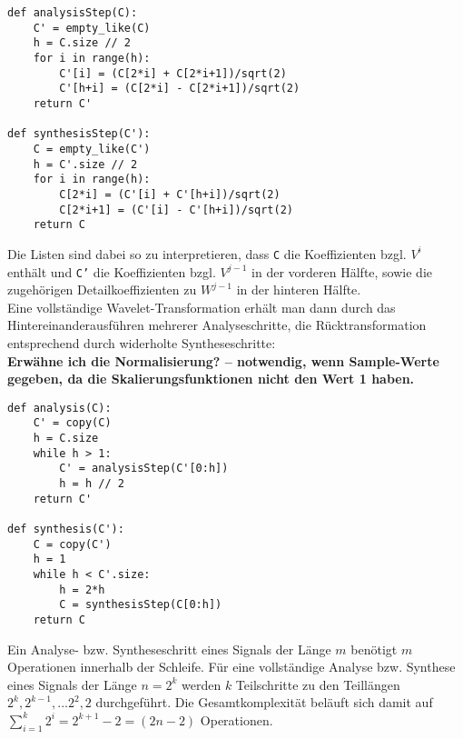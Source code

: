 \documentclass{article}
\begin{document}
%
\begin{verbatim}
def analysisStep(C):
    C' = empty_like(C)
    h = C.size // 2
    for i in range(h):
        C'[i] = (C[2*i] + C[2*i+1])/sqrt(2)
        C'[h+i] = (C[2*i] - C[2*i+1])/sqrt(2)
    return C'

def synthesisStep(C'):
    C = empty_like(C')
    h = C'.size // 2
    for i in range(h):
        C[2*i] = (C'[i] + C'[h+i])/sqrt(2)
        C[2*i+1] = (C'[i] - C'[h+i])/sqrt(2)
    return C
\end{verbatim}
%
Die Listen sind dabei so zu interpretieren, dass \texttt{C} die Koeffizienten bzgl. $V^i$ enthält und \texttt{C'} die Koeffizienten bzgl. $V^{j-1}$ in der vorderen Hälfte, sowie die zugehörigen Detailkoeffizienten zu $W^{j-1}$ in der hinteren Hälfte.\\
Eine vollständige Wavelet-Transformation erhält man dann durch das Hintereinanderausführen mehrerer Analyseschritte, die Rücktransformation entsprechend durch widerholte Syntheseschritte:
\\
\textbf{Erwähne ich die Normalisierung? -- notwendig, wenn Sample-Werte gegeben, da die Skalierungsfunktionen nicht den Wert 1 haben.}
\begin{verbatim}
def analysis(C):
    C' = copy(C)
    h = C.size
    while h > 1:
        C' = analysisStep(C'[0:h])
        h = h // 2
    return C'

def synthesis(C'):
    C = copy(C')
    h = 1
    while h < C'.size:
        h = 2*h
        C = synthesisStep(C[0:h])
    return C
\end{verbatim}
%
Ein Analyse- bzw. Syntheseschritt eines Signals der Länge $m$ benötigt $m$ Operationen innerhalb der Schleife. Für eine vollständige Analyse bzw. Synthese eines Signals der Länge $n=2^k$ werden $k$ Teilschritte zu den Teillängen $2^k, 2^{k-1}, ... 2^2, 2$ durchgeführt. Die Gesamtkomplexität beläuft sich damit auf $\sum_{i=1}^k 2^i = 2^{k+1}-2 = (2n-2)$ Operationen.
%
\end{document}
